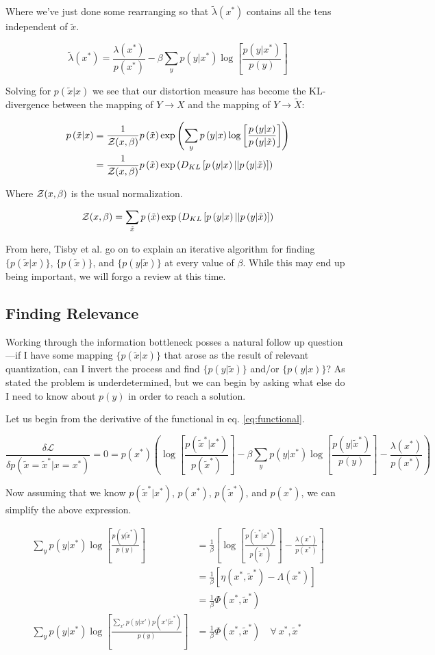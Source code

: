 \documentclass{article}
\newcommand{\pa}{\delta}
\newcommand{\Z}{{\cal Z}}
\newcommand{\be}{\begin{equation}}
\newcommand{\ee}{\end{equation}}
\newcommand{\lp}{\left(}
\newcommand{\rp}{\right)}
\newcommand{\lb}{\left[}
\newcommand{\rb}{\right]}
\newcommand{\xtilde}{\tilde{x}}
\newcommand{\Xtilde}{\tilde{X}}
\newcommand{\pcx}{p\lp \xtilde | x \rp}
\newcommand{\ptx}{p\lp \xtilde \rp}
\newcommand{\Lagr}{\mathcal{L}}
\newcommand{\B}{\beta}
\newcommand{\py}{p\lp y \rp}
\newcommand{\pcxI}{p\lp \xtilde = \xtilde^* | x = x^* \rp}
\newcommand{\pcxi}{p\lp \xtilde^* | x^* \rp}
\newcommand{\pxi}{p\lp x^* \rp}
\newcommand{\ptxi}{p\lp \xtilde^* \rp}
\newcommand{\logpcxptxi}{\log{\lb \frac{\pcxi}{\ptxi} \rb}}
\newcommand{\pyxi}{p\lp y | x^* \rp}
\newcommand{\logpycpyi}{\log{\lb \frac{p\lp y | \xtilde^*\rp}{\py} \rb}}
\newcommand{\logpyxpyi}{\log{\lb \frac{p\lp y | x^*\rp}{\py} \rb}}
\newcommand{\KL}{D_{KL}}
\newcommand{\pyx}{p\lp y | x \rp}
\newcommand{\pyc}{p\lp y | \xtilde \rp}
\newcommand{\logpycpyEXP}{\log{\lb \frac{\sum_{x'}{p\lp y | x'\rp p\lp x'|\xtilde^* \rp}}{\py} \rb}}
\begin{document}
Where we've just done some rearranging so that $\tilde{\lambda}(x^*)$ contains all the tens independent of $\xtilde$.

\be
\tilde{\lambda}(x^*) = \frac{\lambda(x^*)}{\pxi} - \B \sum_{y} \pyxi \logpyxpyi
\ee

Solving for $\pcx$ we see that our distortion measure has become the KL-divergence between the mapping of $Y \rightarrow X$ and the mapping of $Y \rightarrow \Xtilde$: 

\begin{align}
\pcx & = \frac{1}{\Z(x,\B)} \ptx \exp{\lp \sum_y \pyx \log{\lb\frac{\pyx}{\pyc}\rb}\rp} \nonumber \\
& = \frac{1}{\Z(x,\B)} \ptx \exp{\lp \KL\lb \pyx || \pyc \rb \rp}
\end{align}

Where $\Z(x,\B)$ is the usual normalization.

\be
\Z(x,\B) = \sum_{\xtilde} \ptx \exp{\lp \KL\lb \pyx || \pyc \rb \rp}
\ee

From here, Tisby et al. go on to explain an iterative algorithm for finding $\{\pcx\}$, $\{\ptx\}$, and $\{\pyc\}$ at every value of $\B$.  While this may end up being important, we will forgo a review at this time. 


\subsection*{Finding Relevance}

Working through the information bottleneck posses a natural follow up question---if I have some mapping $\{\pcx\}$ that arose as the result of relevant quantization, can I invert the process and find $\{\pyc\}$ and/or $\{\pyx\}$?  As stated the problem is underdetermined, but we can begin by asking what else do I need to know about $\py$ in order to reach a solution\footnotemark.


Let us begin from the derivative of the functional in eq. \ref{eq:functional}.

\be
\frac{\pa \Lagr}{\pa \pcxI} = 0 = \pxi \lp \logpcxptxi - \B \sum_{y} \pyxi \logpycpyi - \frac{\lambda(x^*)}{\pxi}  \rp
\ee

Now assuming that we know $\pcxi$, $\pxi$, $\ptxi$, and $p(x^*)$, we can simplify the above expression.

\begin{align}
\label{eq:step_one}
\sum_{y} \pyxi \logpycpyi &= \frac{1}{\B} \lb \logpcxptxi - \frac{\lambda(x^*)}{\pxi} \rb \nonumber\\
& = \frac{1}{\B} \lb \eta(x^*,\xtilde^*) - \Lambda(x^*)\rb \nonumber\\
& = \frac{1}{\B} \Phi(x^*,\xtilde^*) \nonumber \\
\sum_{y} \pyxi \logpycpyEXP& = \frac{1}{\B} \Phi(x^*,\xtilde^*) \quad  \forall \ x^*,\xtilde^*
\end{align}
\end{document}
